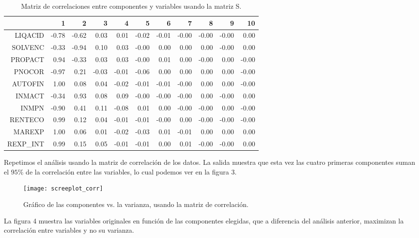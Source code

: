 \documentclass[a4paper,10pt]{article}
\begin{document}
\begin{table}[ht]
\centering
\begin{tabular}{rrrrrrrrrrr}
  \hline
 & 1 & 2 & 3 & 4 & 5 & 6 & 7 & 8 & 9 & 10 \\ 
  \hline
LIQACID & -0.78 & -0.62 & 0.03 & 0.01 & -0.02 & -0.01 & -0.00 & -0.00 & -0.00 & 0.00 \\ 
  SOLVENC & -0.33 & -0.94 & 0.10 & 0.03 & -0.00 & 0.00 & 0.00 & 0.00 & -0.00 & 0.00 \\ 
  PROPACT & 0.94 & -0.33 & 0.03 & 0.03 & -0.00 & 0.01 & 0.00 & -0.00 & 0.00 & -0.00 \\ 
  PNOCOR & -0.97 & 0.21 & -0.03 & -0.01 & -0.06 & 0.00 & 0.00 & 0.00 & 0.00 & -0.00 \\ 
  AUTOFIN & 1.00 & 0.08 & 0.04 & -0.02 & -0.01 & -0.01 & -0.00 & 0.00 & 0.00 & -0.00 \\ 
  INMACT & -0.34 & 0.93 & 0.08 & 0.09 & -0.00 & -0.00 & -0.00 & 0.00 & -0.00 & 0.00 \\ 
  INMPN & -0.90 & 0.41 & 0.11 & -0.08 & 0.01 & 0.00 & -0.00 & -0.00 & 0.00 & -0.00 \\ 
  RENTECO & 0.99 & 0.12 & 0.04 & -0.01 & -0.01 & -0.00 & 0.00 & -0.00 & -0.00 & -0.00 \\ 
  MAREXP & 1.00 & 0.06 & 0.01 & -0.02 & -0.03 & 0.01 & -0.01 & 0.00 & 0.00 & 0.00 \\ 
  REXP\_INT & 0.99 & 0.15 & 0.05 & -0.01 & -0.01 & 0.00 & 0.01 & -0.00 & -0.00 & 0.00 \\ 
   \hline
\end{tabular}
\caption{Matriz de correlaciones entre componentes y variables usando la matriz S.}
\end{table}

Repetimos el análisis usando la matriz de correlación de los datos.
La salida muestra que esta vez las cuatro primeras componentes suman el $95 \%$ de la correlación entre las variables, lo cual podemos ver en la 
figura 3.



\begin{figure}[h]
\centering
\texttt{[image: screeplot\_corr]}
\caption{Gráfico de las componentes vs. la varianza, usando la matriz de correlación.}
\end{figure}

La figura 4 muestra las variables originales en función de las componentes elegidas, que a diferencia del análisis anterior, maximizan la correlación entre
variables y no su varianza.
\end{document}
